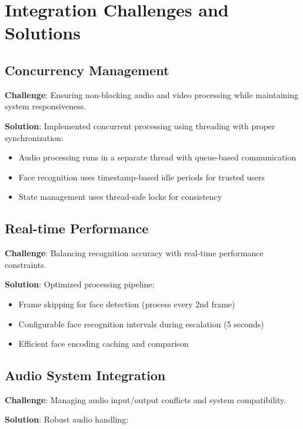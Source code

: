 \documentclass[11pt,a4paper]{article}
\begin{document}
\section{Integration Challenges and Solutions}

\subsection{Concurrency Management}

\textbf{Challenge}: Ensuring non-blocking audio and video processing while maintaining system responsiveness.

\textbf{Solution}: Implemented concurrent processing using threading with proper synchronization:

\begin{itemize}
    \item Audio processing runs in a separate thread with queue-based communication
    \item Face recognition uses timestamp-based idle periods for trusted users
    \item State management uses thread-safe locks for consistency
\end{itemize}

\subsection{Real-time Performance}

\textbf{Challenge}: Balancing recognition accuracy with real-time performance constraints.

\textbf{Solution}: Optimized processing pipeline:

\begin{itemize}
    \item Frame skipping for face detection (process every 2nd frame)
    \item Configurable face recognition intervals during escalation (5 seconds)
    \item Efficient face encoding caching and comparison
\end{itemize}

\subsection{Audio System Integration}

\textbf{Challenge}: Managing audio input/output conflicts and system compatibility.

\textbf{Solution}: Robust audio handling:
\end{document}
